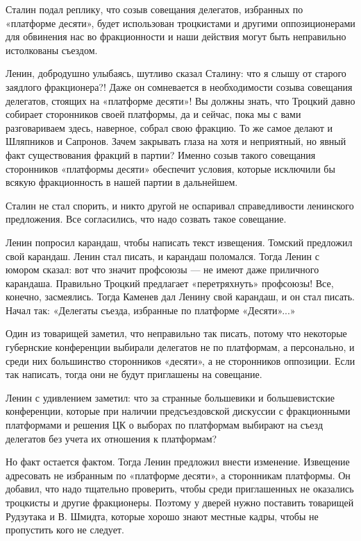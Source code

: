 \documentclass[12pt, a4paper, openany]{book}
\begin{document}
Сталин подал реплику, что созыв совещания делегатов, избранных по «платформе десяти», будет использован троцкистами и другими оппозиционерами для обвинения нас во фракционности и наши действия могут быть неправильно истолкованы съездом.

Ленин, добродушно улыбаясь, шутливо сказал Сталину: что я слышу от старого заядлого фракционера?! Даже он сомневается в необходимости созыва совещания делегатов, стоящих на «платформе десяти»! Вы должны знать, что Троцкий давно собирает сторонников своей платформы, да и сейчас, пока мы с вами разговариваем здесь, наверное, собрал свою фракцию. То же самое делают и Шляпников и Сапронов. Зачем закрывать глаза на хотя и неприятный, но явный факт существования фракций в партии? Именно созыв такого совещания сторонников «платформы десяти» обеспечит условия, которые исключили бы всякую фракционность в нашей партии в дальнейшем.

Сталин не стал спорить, и никто другой не оспаривал справедливости ленинского предложения. Все согласились, что надо созвать такое совещание.

Ленин попросил карандаш, чтобы написать текст извещения. Томский предложил свой карандаш. Ленин стал писать, и карандаш поломался. Тогда Ленин с юмором сказал: вот что значит профсоюзы — не имеют даже приличного карандаша. Правильно Троцкий предлагает «перетряхнуть» профсоюзы! Все, конечно, засмеялись. Тогда Каменев дал Ленину свой карандаш, и он стал писать. Начал так: «Делегаты съезда, избранные по платформе «Десяти»...»

Один из товарищей заметил, что неправильно так писать, потому что некоторые губернские конференции выбирали делегатов не по платформам, а персонально, и среди них большинство сторонников «десяти», а не сторонников оппозиции. Если так написать, тогда они не будут приглашены на совещание.

Ленин с удивлением заметил: что за странные большевики и большевистские конференции, которые при наличии предсъездовской дискуссии с фракционными платформами и решения ЦК о выборах по платформам выбирают на съезд делегатов без учета их отношения к платформам?

Но факт остается фактом. Тогда Ленин предложил внести изменение. Извещение адресовать не избранным по «платформе десяти», а сторонникам платформы. Он добавил, что надо тщательно проверить, чтобы среди приглашенных не оказались троцкисты и другие фракционеры. Поэтому у дверей нужно поставить товарищей Рудзутака и В. Шмидта, которые хорошо знают местные кадры, чтобы не пропустить кого не следует.
\end{document}
